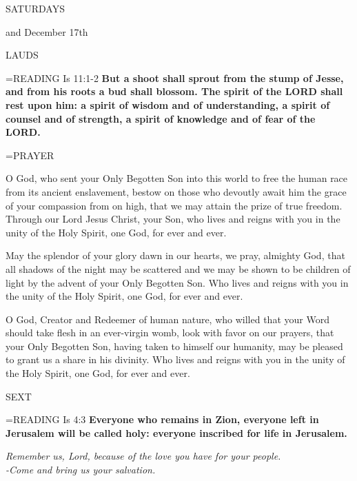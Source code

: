 \begin{center}
\normalsize \begin{center}\normalsize SATURDAYS\\
\end{center}
\footnotesize and December 17th\\
\end{center}

\begin{flushleft}\normalsize LAUDS\\\end{flushleft}

\hangindent=\parindent \small{READING} Is 11:1-2 \textbf{But a shoot shall sprout from the stump of Jesse, and from his roots a bud shall blossom. The spirit of the LORD shall rest upon him: a spirit of wisdom and of understanding, a spirit of counsel and of strength, a spirit of knowledge and of fear of the LORD.\\}

\hangindent=\parindent \small PRAYER
\begin{description}[labelindent=\parindent, noitemsep, leftmargin=*]
\item [Week 1:]  O God, who sent your Only Begotten Son into this world to free the human race from its ancient enslavement, bestow on those who devoutly await him the grace of your compassion from on high, that we may attain the prize of true freedom. Through our Lord Jesus Christ, your Son, who lives and reigns with you in the unity of the Holy Spirit, one God, for ever and ever.
\item [Week 2:]  May the splendor of your glory dawn in our hearts, we pray, almighty God, that all shadows of the night may be scattered and we may be shown to be children of light by the advent of your Only Begotten Son. Who lives and reigns with you in the unity of the Holy Spirit, one God, for ever and ever.
\item [December 17th:]  O God, Creator and Redeemer of human nature, who willed that your Word should take flesh in an ever-virgin womb, look with favor on our prayers, that your Only Begotten Son, having taken to himself our humanity, may be pleased to grant us a share in his divinity. Who lives and reigns with you in the unity of the Holy Spirit, one God, for ever and ever.
\end{description}

\begin{flushleft}\normalsize SEXT\\\end{flushleft}

\hangindent=\parindent \small{READING} Is 4:3 \textbf{Everyone who remains in Zion, everyone left in Jerusalem will be called holy: everyone inscribed for life in Jerusalem.}

\begin{center}
\textit{Remember us, Lord, because of the love you have for your people.\\
-Come and bring us your salvation.}
\end{center}

